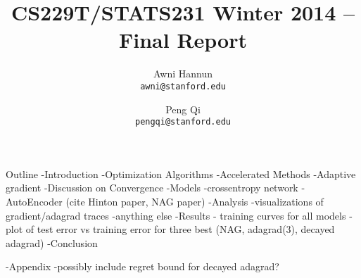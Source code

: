 \documentclass[11pt,english]{article}
\title{
{\large CS229T/STATS231 Winter 2014 -- Final Report }
}
\author{ \large
Awni Hannun \\
\texttt{awni@stanford.edu}
\and
Peng Qi \\
\texttt{pengqi@stanford.edu}
}
\date{}
\newcommand{\1}{\mathbb{I}} %
\begin{document}
\maketitle

Outline
-Introduction
-Optimization Algorithms
  -Accelerated Methods
  -Adaptive gradient
  -Discussion on Convergence
-Models
  -crossentropy network
  -AutoEncoder (cite Hinton paper, NAG paper)
-Analysis
  -visualizations of gradient/adagrad traces
  -anything else
-Results
  - training curves for all models
  - plot of test error vs training error for three best (NAG, adagrad(3), decayed adagrad)
-Conclusion

-Appendix
-possibly include regret bound for decayed adagrad?


{}

\end{document}
